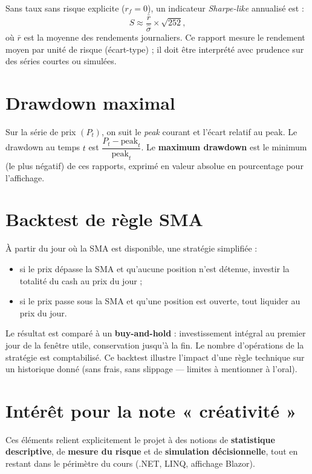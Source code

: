Sans taux sans risque explicite ($r_f = 0$), un indicateur \emph{Sharpe-like} annualisé est :
\begin{equation}
  S \approx \frac{\bar{r}}{\hat{\sigma}} \times \sqrt{252},
\end{equation}
où $\bar{r}$ est la moyenne des rendements journaliers. Ce rapport mesure le rendement moyen par unité de risque (écart-type) ; il doit être interprété avec prudence sur des séries courtes ou simulées.

\section{Drawdown maximal}

Sur la série de prix $(P_t)$, on suit le \emph{peak} courant et l'écart relatif au peak. Le drawdown au temps $t$ est $\dfrac{P_t - \mathrm{peak}_t}{\mathrm{peak}_t}$. Le \textbf{maximum drawdown} est le minimum (le plus négatif) de ces rapports, exprimé en valeur absolue en pourcentage pour l'affichage.

\section{Backtest de règle SMA}

À partir du jour où la SMA est disponible, une stratégie simplifiée :
\begin{itemize}[leftmargin=*]
  \item si le prix dépasse la SMA et qu'aucune position n'est détenue, investir la totalité du cash au prix du jour ;
  \item si le prix passe sous la SMA et qu'une position est ouverte, tout liquider au prix du jour.
\end{itemize}
Le résultat est comparé à un \textbf{buy-and-hold} : investissement intégral au premier jour de la fenêtre utile, conservation jusqu'à la fin. Le nombre d'opérations de la stratégie est comptabilisé. Ce backtest illustre l'impact d'une règle technique sur un historique donné (sans frais, sans slippage --- limites à mentionner à l'oral).

\section{Intérêt pour la note « créativité »}

Ces éléments relient explicitement le projet à des notions de \textbf{statistique descriptive}, de \textbf{mesure du risque} et de \textbf{simulation décisionnelle}, tout en restant dans le périmètre du cours (.NET, LINQ, affichage Blazor).
